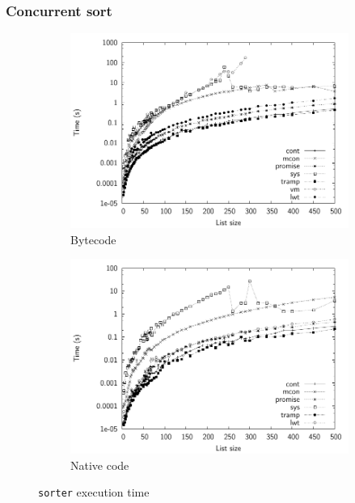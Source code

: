 \documentclass[12pt,twoside,notitlepage]{report}
\begin{document}
\subsubsection{Concurrent sort}
\begin{figure}[h]
\centering
\begin{subfigure}[b]{0.45\linewidth}
\includegraphics[width=\linewidth]{./sorter_exec_times_bw}
\caption{Bytecode}
\label{fig:sorter_exec_times_bc}
\end{subfigure}
\begin{subfigure}[b]{0.45\linewidth}
\includegraphics[width=\linewidth]{./sorter_exec_times_opt_bw}
\caption{Native code}
\label{fig:sorter_exec_times_nat}
\end{subfigure}
\cprotect\caption{\verb|sorter| execution time}
\label{fig:sorter_exec_times}
\end{figure}
\end{document}
